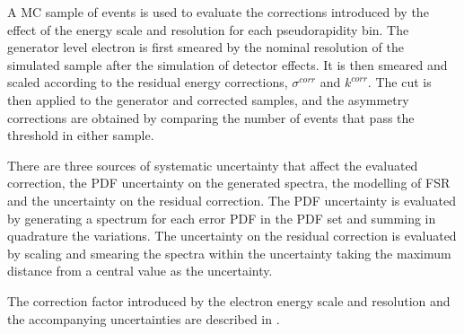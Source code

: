 
A {MC} sample of \HepProcess{\PW\to\Pe\Pnue} events is used to evaluate the
corrections introduced by the effect of the energy scale and resolution for each
pseudorapidity bin. The generator level electron \pT is first smeared by the
nominal \pT resolution of the simulated sample after the simulation of detector
effects. It is then smeared and scaled according to the residual energy
corrections, $\sigma^{corr}$ and $k^{corr}$. The \pT cut is then applied to the
generator and corrected samples, and the asymmetry corrections are obtained by
comparing the number of events that pass the threshold in either sample.

There are three sources of systematic uncertainty that affect the evaluated
correction, the {PDF} uncertainty on the generated \pT spectra, the modelling
of {FSR} and the uncertainty on the residual correction. The {PDF}
uncertainty is evaluated by generating a \pT spectrum for each error {PDF}  in
the {PDF} set and summing in quadrature the variations. The uncertainty on
the residual correction is evaluated by scaling and smearing the \pT spectra
within the uncertainty taking the maximum distance from a central value as the
uncertainty. 

The correction factor introduced by the electron energy scale and resolution and
the accompanying uncertainties are described in .

